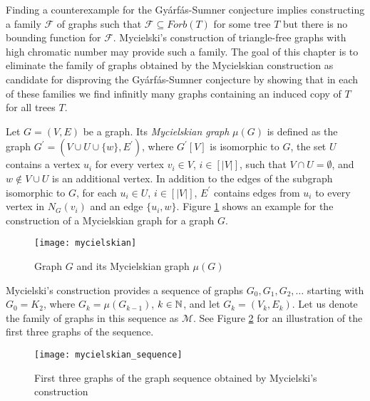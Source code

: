 Finding a counterexample for the Gyárfás-Sumner conjecture implies constructing a family $\mathcal{F}$ of graphs such that $\mathcal{F}\subseteq\textit{Forb}(T)$ for some tree $T$ but there is no bounding function for $\mathcal{F}$. Mycielski's construction of triangle-free graphs with high chromatic number \cite{My55} may provide such a family. The goal of this chapter is to eliminate the family of graphs obtained by the Mycielskian construction as candidate for disproving the Gyárfás-Sumner conjecture by showing that in each of these families we find infinitly many graphs containing an induced copy of $T$ for all trees $T$.

\begin{defn}
Let $G=(V,E)$ be a graph. Its \textit{Mycielskian graph} $\mu(G)$ is defined as the graph $G^\prime=(V\cup U\cup\{w\}, E^\prime)$, where $G^\prime [V]$ is isomorphic to $G$, the set $U$ contains a vertex $u_i$ for every vertex $v_i\in V$, $i\in [\vert V\vert]$, such that $V\cap U=\emptyset$, and $w\notin V\cup U$ is an additional vertex. In addition to the edges of the subgraph isomorphic to $G$, for each $u_i\in U$, $i\in [\vert V\vert]$, $E^\prime$ contains edges from $u_i$ to every vertex in $N_G(v_i)$ and an edge $\lbrace u_i ,w\rbrace$. Figure \ref{f1my} shows an example for the construction of a Mycielskian graph for a graph $G$.
\end{defn}

\begin{figure}[ht]
\begin{center}
\texttt{[image: mycielskian]}
\end{center}
\caption{Graph $G$ and its Mycielskian graph $\mu (G)$}
\label{f1my}
\end{figure}

Mycielski's construction provides a sequence of graphs $G_0, G_1, G_2,\dots $ starting with $G_0=K_2$, where $G_k = \mu (G_{k-1})$, $k\in\mathbb{N}$, and let $G_k=(V_k,E_k)$. Let us denote the family of graphs in this sequence as $\mathcal{M}$. See Figure \ref{f2my} for an illustration of the first three graphs of the sequence. 

\begin{figure}[ht]
\begin{center}
\texttt{[image: mycielskian\_sequence]}
\end{center}
\caption{First three graphs of the graph sequence obtained by Mycielski's construction}
\label{f2my}
\end{figure}


